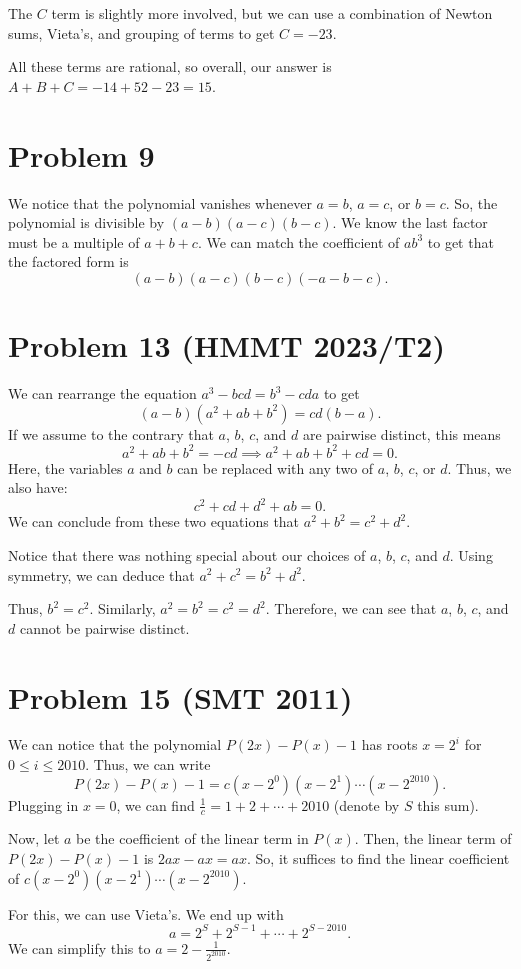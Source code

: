 \documentclass{scrartcl}
\begin{document}
The $C$ term is slightly more involved, but we can use a combination of Newton sums, Vieta's, and grouping of terms to get $C = -23$.

All these terms are rational, so overall, our answer is $A + B + C = -14 + 52 - 23 = 15$.
\section*{Problem 9}
We notice that the polynomial vanishes whenever $a=b$, $a=c$, or $b=c$. So, the polynomial is divisible by $(a-b)(a-c)(b-c)$. We know the last factor must be a multiple of $a+b+c$. We can match the coefficient of $ab^3$ to get that the factored form is
\[
    (a-b)(a-c)(b-c)(-a-b-c).
\]

\section*{Problem 13 (HMMT 2023/T2)}
We can rearrange the equation $a^3 - bcd = b^3 - cda$ to get
\[
    (a - b)(a^2 + ab + b^2) = cd(b - a).
\]
If we assume to the contrary that $a$, $b$, $c$, and $d$ are pairwise distinct, this means
\[
    a^2 + ab + b^2 = -cd \implies a^2 + ab + b^2 + cd = 0.
\]
Here, the variables $a$ and $b$ can be replaced with any two of $a$, $b$, $c$, or $d$. Thus, we also have:
\[
    c^2 + cd + d^2 + ab = 0.
\]
We can conclude from these two equations that $a^2 + b^2 = c^2 + d^2$.

Notice that there was nothing special about our choices of $a$, $b$, $c$, and $d$. Using symmetry, we can deduce that $a^2 + c^2 = b^2 + d^2$.

Thus, $b^2 = c^2$. Similarly, $a^2 = b^2 = c^2 = d^2$. Therefore, we can see that $a$, $b$, $c$, and $d$ cannot be pairwise distinct.
\section*{Problem 15 (SMT 2011)}
We can notice that the polynomial $P(2x) - P(x) - 1$ has roots $x = 2^i$ for $0 \leq i \leq 2010$.
Thus, we can write
\[
    P(2x) - P(x) - 1 = c(x - 2^0)(x - 2^1)\cdots(x - 2^{2010}).
\]
Plugging in $x = 0$, we can find $\frac{1}{c} = 1 + 2 + \cdots + 2010$ (denote by $S$ this sum).

Now, let $a$ be the coefficient of the linear term in $P(x)$. Then, the linear term of $P(2x) - P(x) - 1$ is $2ax - ax = ax$. So, it suffices to find the linear coefficient of $c(x - 2^0)(x - 2^1)\cdots(x - 2^{2010})$.

For this, we can use Vieta's. We end up with
\[
    a = 2^S + 2^{S-1} + \cdots + 2^{S - 2010}.
\]
We can simplify this to $a = 2 - \frac{1}{2^{2010}}.$
\end{document}
